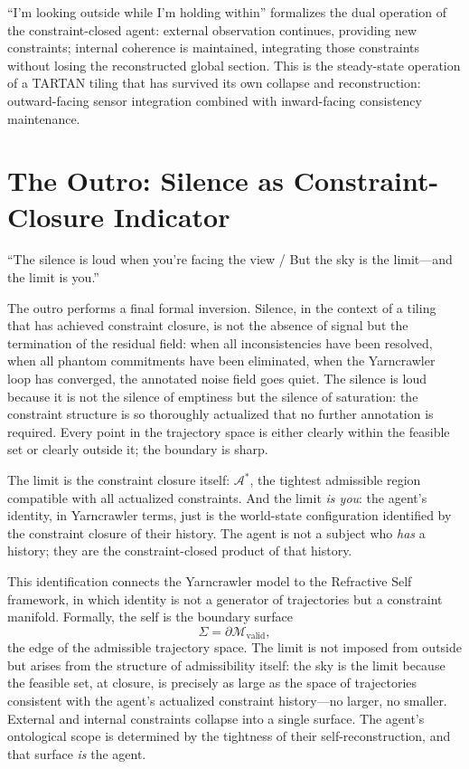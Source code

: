 \documentclass[12pt, a4paper]{article}
\begin{document}
``I'm looking outside while I'm holding within'' formalizes the dual operation of the constraint-closed agent: external observation continues, providing new constraints; internal coherence is maintained, integrating those constraints without losing the reconstructed global section. This is the steady-state operation of a TARTAN tiling that has survived its own collapse and reconstruction: outward-facing sensor integration combined with inward-facing consistency maintenance.

\section{The Outro: Silence as Constraint-Closure Indicator}

``The silence is loud when you're facing the view / But the sky is the limit---and the limit is you.''

The outro performs a final formal inversion. Silence, in the context of a tiling that has achieved constraint closure, is not the absence of signal but the termination of the residual field: when all inconsistencies have been resolved, when all phantom commitments have been eliminated, when the Yarncrawler loop has converged, the annotated noise field goes quiet. The silence is loud because it is not the silence of emptiness but the silence of saturation: the constraint structure is so thoroughly actualized that no further annotation is required. Every point in the trajectory space is either clearly within the feasible set or clearly outside it; the boundary is sharp.

The limit is the constraint closure itself: $\mathcal{A}^*$, the tightest admissible region compatible with all actualized constraints. And the limit \textit{is you}: the agent's identity, in Yarncrawler terms, just is the world-state configuration identified by the constraint closure of their history. The agent is not a subject who \textit{has} a history; they are the constraint-closed product of that history.

This identification connects the Yarncrawler model to the Refractive Self framework, in which identity is not a generator of trajectories but a constraint manifold. Formally, the self is the boundary surface
\[
\Sigma = \partial\mathcal{M}_{\text{valid}},
\]
the edge of the admissible trajectory space. The limit is not imposed from outside but arises from the structure of admissibility itself: the sky is the limit because the feasible set, at closure, is precisely as large as the space of trajectories consistent with the agent's actualized constraint history---no larger, no smaller. External and internal constraints collapse into a single surface. The agent's ontological scope is determined by the tightness of their self-reconstruction, and that surface \textit{is} the agent.
\end{document}
